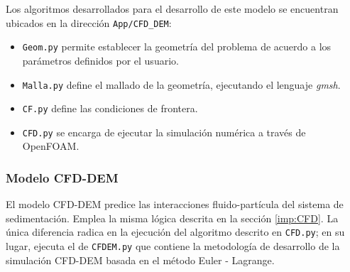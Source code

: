 \noindent
\justify

Los algoritmos desarrollados para el desarrollo de este modelo se encuentran ubicados en la direcci\'on \texttt{App/{CFD\_DEM}}:

\begin{itemize}
	\item \texttt{Geom.py} permite establecer la geometr\'ia del problema de acuerdo a los par\'ametros definidos por el usuario.
	\item \texttt{Malla.py} define el mallado de la geometr\'ia, ejecutando el lenguaje \textit{gmsh}.
	\item \texttt{CF.py} define las condiciones de frontera.
	\item \texttt{CFD.py} se encarga de ejecutar la simulaci\'on num\'erica a trav\'es de OpenFOAM.
\end{itemize}

\subsubsection{Modelo CFD-DEM}

\noindent
\justify

El modelo CFD-DEM predice las interacciones fluido-part\'icula del sistema de sedimentaci\'on. Emplea la misma l\'ogica descrita en la secci\'on \ref{imp:CFD}. La \'unica diferencia radica en la ejecuci\'on del algoritmo descrito en \texttt{CFD.py}; en su lugar, ejecuta el de \texttt{CFDEM.py} que contiene la metodolog\'ia de desarrollo de la simulaci\'on CFD-DEM basada en el m\'etodo Euler - Lagrange.

